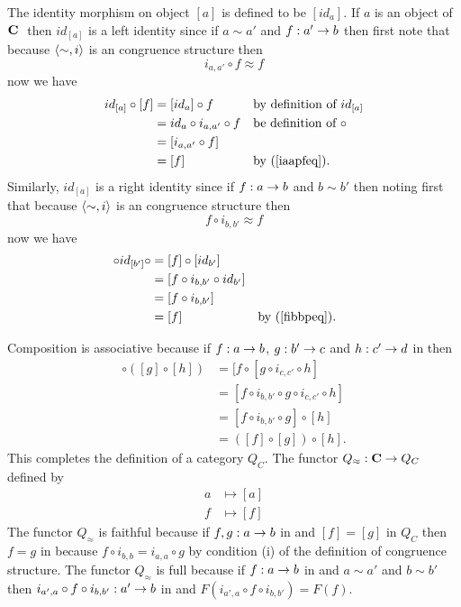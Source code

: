 \documentclass[10pt,a4paper]{article}
\theoremstyle{remark}
\begin{document}
The identity morphism on object $[a]$ is defined to be $[id_a]$. If $a$ is an object of $\textbf{C}\ $ then $id_{[a]}$ is a left identity since if  $a \sim a'$ and $f:a' \rightarrow b$ then 
first note that because $\langle\sim,i\rangle$ is an congruence structure then
\begin{equation}
\label{iaapfeq}
i_{a,a'} \circ f  \approx f
\end{equation}
now we have 
\begin{align*}
id_{[a]} \circ [f] 
         & = [id_a] \circ f               && \mbox{by definition of $id_{[a]}$}    \\
				 & = id_a \circ i_{a,a'} \circ f  && \mbox{be definition of $\circ$}       \\
         &= [i_{a,a'} \circ f]                                                     \\
         &= [f]                           && \mbox {by (\ref{iaapfeq}). }
\end{align*}
Similarly, $id_{[a]}$ is a right identity since if $f:a \rightarrow b$ and $b \sim b'$  then
noting first  that because $\langle\sim,i\rangle$ is an congruence structure then
\begin{equation}
\label{fibbpeq}
 f \circ i_{b,b'} \approx f
\end{equation}
now we have 
\begin{align*}
[f] \circ id_{[b']} \circ  
                 & = [f]  \circ [id_{b'}]                                     \\
                 &=  [f \circ i_{b,b'} \circ id_{b'} ]                                  \\
                 &=  [f \circ i_{b,b'} ]                                                \\
                 &=  [f]                               &&\mbox {by (\ref{fibbpeq}). }
\end{align*}


Composition is associative because if $f:a \rightarrow b$, $g: b' \rightarrow c$  and $h: c' \rightarrow d$ in \catcw then
\begin{align*}
[f] \circ ([g] \circ [h]) &= [f \circ [g \circ i_{c,c'} \circ h]               \\
                          &= [f \circ i_{b,b'} \circ g \circ i_{c,c'} \circ h] \\
													&= [f \circ i_{b,b'} \circ g] \circ [h]              \\
													&= ([f] \circ [g]) \circ [h].
\end{align*}
This completes the definition of a category $Q_C$.
The functor $Q_\approx: \textbf{C} \rightarrow Q_C$ defined by
\begin{align*}
       a & \mapsto [a] \\
			 f & \mapsto [f]
\end{align*}
The functor $Q_\approx$ is faithful because if $f,g : a \rightarrow b$ in \catcw and $[f]=[g]$ in $Q_C$
then $f=g$ in \catcw because $f \circ i_{b,b}=i_{a,a} \circ g$ by condition (i) of the definition of congruence structure.
The functor $Q_\approx$ is full because if $f:a \rightarrow b$ in \catcw and $a \sim a'$ and
$b \sim b'$ then $i_{a',a} \circ f \circ i_{b,b'}: a' \rightarrow b$ in \catcw and 
$F(i_{a',a} \circ f \circ i_{b,b'})=F(f)$.  
\end{document}
